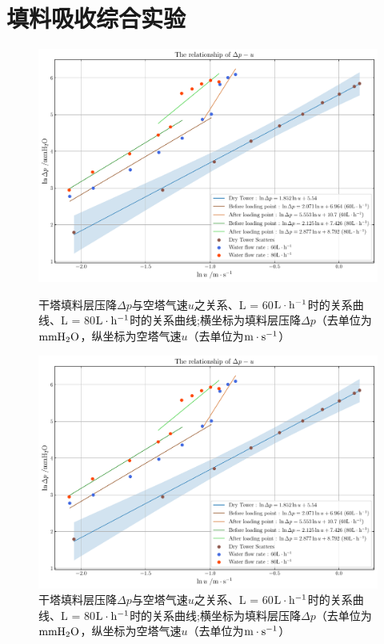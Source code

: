 \documentclass[UTF8,AutoFakeBold,a4paper]{article}
\begin{document}
\newpage
\section{填料吸收综合实验}
\setcounter{figure}{4}
\begin{figure}[h]
	\centering
	\includegraphics[scale=0.6]{填料吸收}
	\caption{干塔填料层压降$\Delta p$与空塔气速$u$之关系、L = 60$\rm{L}\cdot\rm{h}^{-1}$时的关系曲线、L = 80$\rm{L}\cdot\rm{h}^{-1}$时的关系曲线;横坐标为填料层压降$\Delta p$（去单位为$\rm{mmH}_{2}\rm{O}$，纵坐标为空塔气速$u$（去单位为$\rm{m}\cdot\rm{s}^{-1}$）}
	\vspace*{20pt}
	\centering
	\includegraphics[scale=0.5]{填料吸收}
	\caption{干塔填料层压降$\Delta p$与空塔气速$u$之关系、L = 60$\rm{L}\cdot\rm{h}^{-1}$时的关系曲线、L = 80$\rm{L}\cdot\rm{h}^{-1}$时的关系曲线;横坐标为填料层压降$\Delta p$（去单位为$\rm{mmH}_{2}\rm{O}$，纵坐标为空塔气速$u$（去单位为$\rm{m}\cdot\rm{s}^{-1}$）}
\end{figure}
\setcounter{table}{0}
\end{document}
